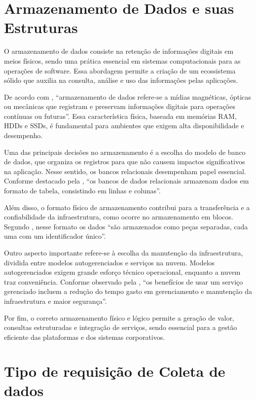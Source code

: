 \documentclass[
    12pt
    ,oneside
    ,a4paper
    ,chapter=TITLE
    ,section=TITLE
    ,sumario=abnt-6027-2012]{abntex2}
\begin{document}
\section{Armazenamento de Dados e suas Estruturas}

O armazenamento de dados consiste na retenção de informações digitais em meios físicos, sendo uma prática essencial em sistemas computacionais para as operações de software. Essa abordagem permite a criação de um ecossistema sólido que auxilia na consulta, análise e uso das informações pelas aplicações.

De acordo com , “armazenamento de dados refere-se a mídias magnéticas, ópticas ou mecânicas que registram e preservam informações digitais para operações contínuas ou futuras”. Essa característica física, baseada em memórias RAM, HDDs e SSDs, é fundamental para ambientes que exigem alta disponibilidade e desempenho.

Uma das principais decisões no armazenamento é a escolha do modelo de banco de dados, que organiza os registros para que não causem impactos significativos na aplicação. Nesse sentido, os bancos relacionais desempenham papel essencial. Conforme destacado pela , “os bancos de dados relacionais armazenam dados em formato de tabela, consistindo em linhas e colunas”.

Além disso, o formato físico de armazenamento contribui para a transferência e a confiabilidade da infraestrutura, como ocorre no armazenamento em blocos. Segundo , nesse formato os dados “são armazenados como peças separadas, cada uma com um identificador único”.

Outro aspecto importante refere-se à escolha da manutenção da infraestrutura, dividida entre modelos autogerenciados e serviços na nuvem. Modelos autogerenciados exigem grande esforço técnico operacional, enquanto a nuvem traz conveniência. Conforme observado pela , “os benefícios de usar um serviço gerenciado incluem a redução do tempo gasto em gerenciamento e manutenção da infraestrutura e maior segurança”.

Por fim, o correto armazenamento físico e lógico permite a geração de valor, consultas estruturadas e integração de serviços, sendo essencial para a gestão eficiente das plataformas e dos sistemas corporativos.

\section{Tipo de requisição de Coleta de dados}
\end{document}
